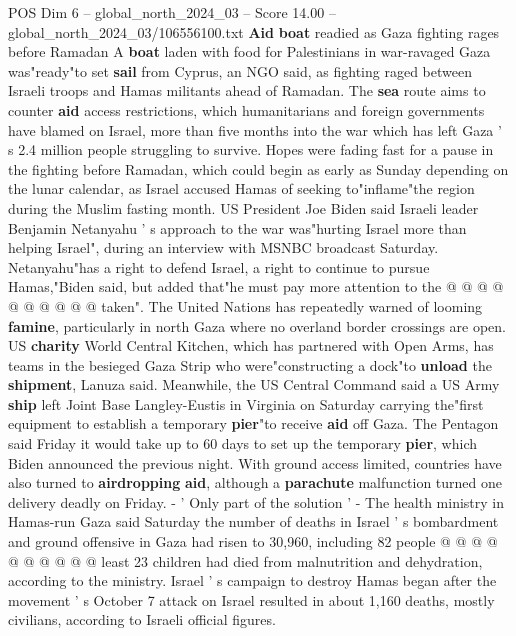 \begin{textsample}{POS Dim 6 – global\_north\_2024\_03 – Score 14.00 – global\_north\_2024\_03/106556100.txt}  \label{ex:f6_pos_045}
\textbf{Aid} \textbf{boat} readied as Gaza fighting rages before Ramadan A \textbf{boat} laden with food for Palestinians in war-ravaged Gaza was"ready"to set \textbf{sail} from Cyprus, an NGO said, as fighting raged between Israeli troops and Hamas militants ahead of Ramadan.
The \textbf{sea} route aims to counter \textbf{aid} access restrictions, which humanitarians and foreign governments have blamed on Israel, more than five months into the war which has left Gaza ' s 2.4 million people struggling to survive.
Hopes were fading fast for a pause in the fighting before Ramadan, which could begin as early as Sunday depending on the lunar calendar, as Israel accused Hamas of seeking to"inflame"the region during the Muslim fasting month.
US President Joe Biden said Israeli leader Benjamin Netanyahu ' s approach to the war was"hurting Israel more than helping Israel", during an interview with MSNBC broadcast Saturday.
Netanyahu"has a right to defend Israel, a right to continue to pursue Hamas,"Biden said, but added that"he must pay more attention to the @ @ @ @ @ @ @ @ @ @ taken".
The United Nations has repeatedly warned of looming \textbf{famine}, particularly in north Gaza where no overland border crossings are open.
US \textbf{charity} World Central Kitchen, which has partnered with Open Arms, has teams in the besieged Gaza Strip who were"constructing a dock"to \textbf{unload} the \textbf{shipment}, Lanuza said.
Meanwhile, the US Central Command said a US Army \textbf{ship} left Joint Base Langley-Eustis in Virginia on Saturday carrying the"first equipment to establish a temporary \textbf{pier}"to receive \textbf{aid} off Gaza.
The Pentagon said Friday it would take up to 60 days to set up the temporary \textbf{pier}, which Biden announced the previous night.
With ground access limited, countries have also turned to \textbf{airdropping} \textbf{aid}, although a \textbf{parachute} malfunction turned one delivery deadly on Friday. - ' Only part of the solution ' - The health ministry in Hamas-run Gaza said Saturday the number of deaths in Israel ' s bombardment and ground offensive in Gaza had risen to 30,960, including 82 people @ @ @ @ @ @ @ @ @ @ least 23 children had died from malnutrition and dehydration, according to the ministry.
Israel ' s campaign to destroy Hamas began after the movement ' s October 7 attack on Israel resulted in about 1,160 deaths, mostly civilians, according to Israeli official figures.

\end{textsample}
